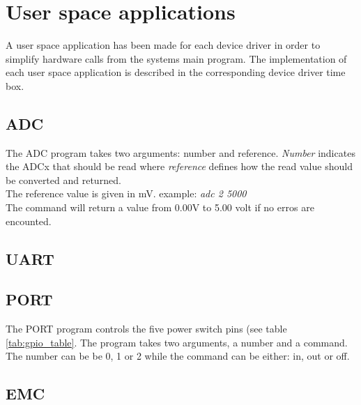 \section{User space applications}
A user space application has been made for each device driver in order to simplify hardware calls from the systems main program. The implementation of each user space application is described in the corresponding device driver time box. 
\subsection{ADC}
The ADC program takes two arguments: number and reference. \textit{Number} indicates the ADCx that should be read where \textit{reference} defines how the read value should be converted and returned. 
\\The reference value is given in mV.
\p example: \textit{adc 2 5000}
\\The command will return a value from 0.00V to 5.00 volt if no erros are encounted. 
\subsection{UART}

\subsection{PORT}
The PORT program controls the five power switch pins (see table \ref{tab:gpio_table}. The program takes two arguments, a number and a command. The number can be be 0, 1 or 2 while the command can be either: in, out or off.
\subsection{EMC}
